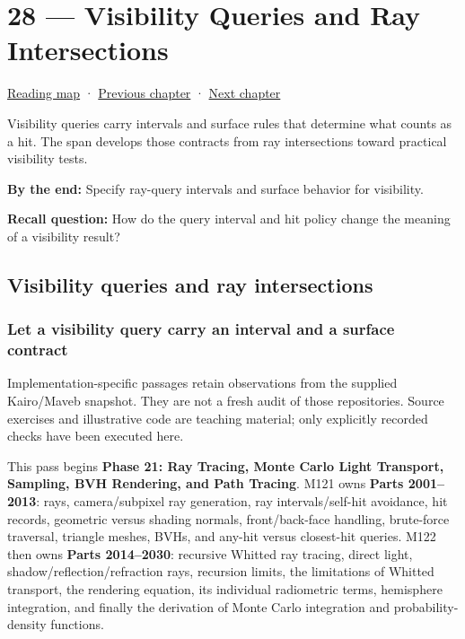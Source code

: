 \hypertarget{04-visual-computing-ii-ch028}{}
\chapter{28 --- Visibility Queries and Ray Intersections}\label{04-visual-computing-ii-ch028-visibility-queries-and-ray-intersections}

\hyperref[volume-reading-map]{Reading map} · \hyperref[04-visual-computing-ii-ch027-mesh-queries-classification-and-clipping]{Previous chapter} · \hyperref[04-visual-computing-ii-ch029-acceleration-structures-and-robust-queries]{Next chapter}

Visibility queries carry intervals and surface rules that determine what counts as a hit. The span develops those contracts from ray intersections toward practical visibility tests.

\textbf{By the end:} Specify ray-query intervals and surface behavior for visibility.

\textbf{Recall question:} How do the query interval and hit policy change the meaning of a visibility result?

\section{Visibility queries and ray intersections}\label{04-visual-computing-ii-ch028-visibility-queries-and-ray-intersections-1}

\subsection{Let a visibility query carry an interval and a surface contract}\label{04-visual-computing-ii-ch028-let-a-visibility-query-carry-an-interval-and-a-surface-contract}

Implementation-specific passages retain observations from the supplied Kairo/Maveb snapshot. They are not a fresh audit of those repositories. Source exercises and illustrative code are teaching material; only explicitly recorded checks have been executed here.

This pass begins \textbf{Phase 21: Ray Tracing, Monte Carlo Light Transport, Sampling, BVH Rendering, and Path Tracing}. M121 owns \textbf{Parts 2001--2013}: rays, camera/subpixel ray generation, ray intervals/self-hit avoidance, hit records, geometric versus shading normals, front/back-face handling, brute-force traversal, triangle meshes, BVHs, and any-hit versus closest-hit queries. M122 then owns \textbf{Parts 2014--2030}: recursive Whitted ray tracing, direct light, shadow/reflection/refraction rays, recursion limits, the limitations of Whitted transport, the rendering equation, its individual radiometric terms, hemisphere integration, and finally the derivation of Monte Carlo integration and probability-density functions.

